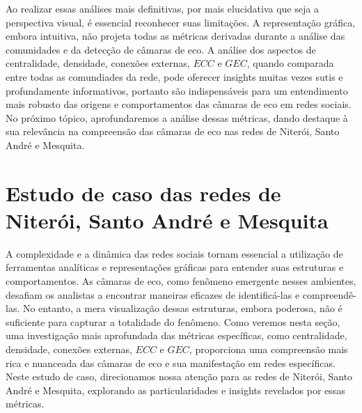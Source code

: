 Ao realizar essas análises mais definitivas, por mais elucidativa que seja a perspectiva visual, é essencial reconhecer suas limitações. A representação gráfica, embora intuitiva, não projeta todas as métricas derivadas durante a análise das comunidades e da detecção de câmaras de eco. A análise dos aspectos de centralidade, densidade, conexões externas, $ECC$ e $GEC$, quando comparada entre todas as comundiades da rede, pode oferecer insights muitas vezes sutis e profundamente informativos, portanto são indispensáveis para um entendimento mais robusto das origens e comportamentos das câmaras de eco em redes sociais. No próximo tópico, aprofundaremos a análise dessas métricas, dando destaque à sua relevância na compreensão das câmaras de eco nas redes de Niterói, Santo André e Mesquita.

\section{Estudo de caso das redes de Niterói, Santo André e Mesquita}

A complexidade e a dinâmica das redes sociais tornam essencial a utilização de ferramentas analíticas e representações gráficas para entender suas estruturas e comportamentos. As câmaras de eco, como fenômeno emergente nesses ambientes, desafiam os analistas a encontrar maneiras eficazes de identificá-las e compreendê-las. No entanto, a mera visualização dessas estruturas, embora poderosa, não é suficiente para capturar a totalidade do fenômeno. Como veremos nesta seção, uma investigação mais aprofundada das métricas específicas, como centralidade, densidade, conexões externas, $ECC$ e $GEC$, proporciona uma compreensão mais rica e nuanceada das câmaras de eco e sua manifestação em redes específicas. Neste estudo de caso, direcionamos nossa atenção para as redes de Niterói, Santo André e Mesquita, explorando as particularidades e insights revelados por essas métricas.

